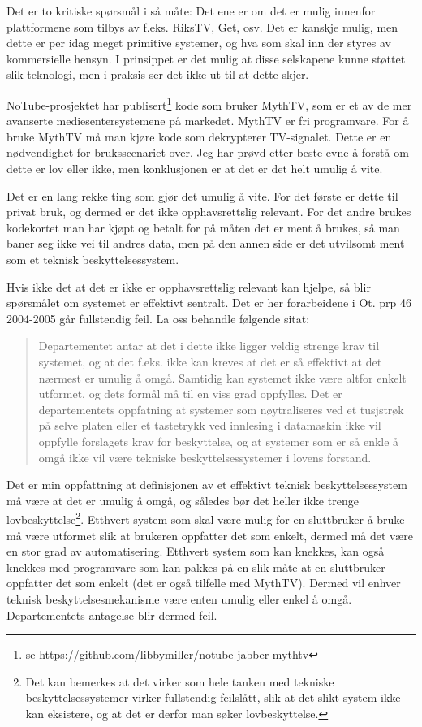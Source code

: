 \documentclass[11pt,norsk,a4paper]{article}
\begin{document}
Det er to kritiske spørsmål i så måte: Det ene er om det er mulig
innenfor plattformene som tilbys av f.eks. RiksTV, Get, osv. Det er
kanskje mulig, men dette er per idag meget primitive systemer, og hva
som skal inn der styres av kommersielle hensyn. I prinsippet er det
mulig at disse selskapene kunne støttet slik teknologi, men i praksis
ser det ikke ut til at dette skjer.

NoTube-prosjektet har
publisert\footnote{se \url{https://github.com/libbymiller/notube-jabber-mythtv}}
kode som bruker MythTV, som er et av de mer avanserte
mediesentersystemene på markedet. MythTV er fri programvare. For å
bruke MythTV må man kjøre kode som dekrypterer TV-signalet. Dette er
en nødvendighet for bruksscenariet over. Jeg har prøvd etter beste
evne å forstå om dette er lov eller ikke, men konklusjonen er at det
er det helt umulig å vite. 

Det er en lang rekke ting som gjør det umulig å vite. For det første
er dette til privat bruk, og dermed er det ikke opphavsrettslig
relevant. For det andre brukes kodekortet man har kjøpt og betalt for
på måten det er ment å brukes, så man baner seg ikke vei til andres
data, men på den annen side er det utvilsomt ment som et teknisk
beskyttelsessystem.

Hvis ikke det at det er ikke er opphavsrettslig relevant kan hjelpe,
så blir spørsmålet om systemet er effektivt sentralt. Det er her
forarbeidene i Ot. prp 46 2004-2005 går fullstendig feil. La oss
behandle følgende sitat:

\begin{quote}
Departementet antar at det i dette ikke ligger veldig strenge krav til
systemet, og at det f.eks. ikke kan kreves at det er så effektivt at
det nærmest er umulig å omgå. Samtidig kan systemet ikke være altfor
enkelt utformet, og dets formål må til en viss grad oppfylles. Det er
departementets oppfatning at systemer som nøytraliseres ved et
tusjstrøk på selve platen eller et tastetrykk ved innlesing i
datamaskin ikke vil oppfylle forslagets krav for beskyttelse, og at
systemer som er så enkle å omgå ikke vil være tekniske
beskyttelsessystemer i lovens forstand.
\end{quote}

Det er min oppfattning at definisjonen av et effektivt teknisk
beskyttelsessystem må være at det er umulig å omgå, og således bør det
heller ikke trenge lovbeskyttelse\footnote{Det kan bemerkes at det
virker som hele tanken med tekniske beskyttelsessystemer virker
fullstendig feilslått, slik at det slikt system ikke kan eksistere, og
at det er derfor man søker lovbeskyttelse.}. Etthvert system som skal
være mulig for en sluttbruker å bruke må være utformet slik at
brukeren oppfatter det som enkelt, dermed må det være en stor grad av
automatisering. Etthvert system som kan knekkes, kan også knekkes med
programvare som kan pakkes på en slik måte at en sluttbruker oppfatter
det som enkelt (det er også tilfelle med MythTV). Dermed vil enhver
teknisk beskyttelsesmekanisme være enten umulig eller enkel å
omgå. Departementets antagelse blir dermed feil. 
\end{document}
